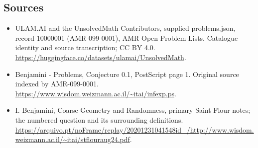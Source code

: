 \documentclass[11pt,a4paper]{article}
\begin{document}
\subsection{Sources}
\begin{itemize}
\item[S1] ULAM.AI and the UnsolvedMath Contributors, supplied problems.json, record 10000001 (AMR-099-0001), AMR Open Problem Lists. Catalogue identity and source transcription; CC BY 4.0.
\url{https://huggingface.co/datasets/ulamai/UnsolvedMath}.
\item[S2] Benjamini - Problems, Conjecture 0.1, PostScript page 1. Original source indexed by AMR-099-0001.
\url{https://www.wisdom.weizmann.ac.il/~itai/infexp.ps}.
\item[S3] I. Benjamini, Coarse Geometry and Randomness, primary Saint-Flour notes; the numbered question and its surrounding definitions.
\url{https://arquivo.pt/noFrame/replay/20201231041548id_/http://www.wisdom.weizmann.ac.il/~itai/stflouraug24.pdf}.
\end{itemize}
\end{document}
